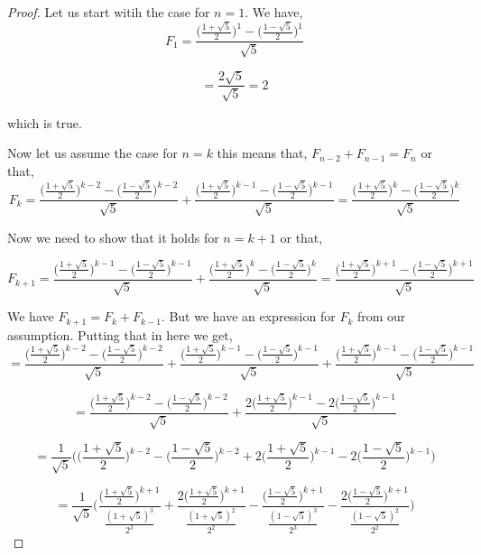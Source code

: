 \documentclass[a4paper]{report}
\begin{document}
\begin{proof}
    Let us start witih the case for $n = 1$. We have, 
    $$ F_1 = \frac{\big ( \frac{1 + \sqrt{5}}{2}\big)^{1} - \big ( \frac{1 - \sqrt{5}}{2}\big)^{1}}{\sqrt{5}} $$ 
    
    $$  = \frac{2\sqrt{5}}{\sqrt{5}} = 2  $$

    which is true.

    Now let us assume the case for $n = k$ this means that, $F_{n - 2} + F_{n - 1} = F_n$ or that,  
    $$ F_k = \frac{\big ( \frac{1 + \sqrt{5}}{2}\big)^{k - 2} - \big ( \frac{1 - \sqrt{5}}{2}\big)^{k - 2}}{\sqrt{5}}  + \frac{\big ( \frac{1 + \sqrt{5}}{2}\big)^{ k - 1} - \big ( \frac{1 - \sqrt{5}}{2}\big)^{k - 1}}{\sqrt{5}} = \frac{\big ( \frac{1 + \sqrt{5}}{2}\big)^{k} - \big ( \frac{1 - \sqrt{5}}{2}\big)^{k}}{\sqrt{5}}$$ 

    Now we need to show that it holds for $n = k + 1$ or that, 

    $$ F_{k + 1} = \frac{\big ( \frac{1 + \sqrt{5}}{2}\big)^{k - 1} - \big ( \frac{1 - \sqrt{5}}{2}\big)^{k - 1}}{\sqrt{5}}  + \frac{\big ( \frac{1 + \sqrt{5}}{2}\big)^{ k} - \big ( \frac{1 - \sqrt{5}}{2}\big)^{k}}{\sqrt{5}} = \frac{\big ( \frac{1 + \sqrt{5}}{2}\big)^{k + 1} - \big ( \frac{1 - \sqrt{5}}{2}\big)^{k + 1}}{\sqrt{5}}$$ 

    We have $F_{k + 1} = F_k + F_{k - 1}$. But we have an expression for  $F_k$ from our assumption. Putting that in here we get, 
    $$ = \frac{\big ( \frac{1 + \sqrt{5}}{2}\big)^{k - 2} - \big ( \frac{1 - \sqrt{5}}{2}\big)^{k - 2}}{\sqrt{5}}  + \frac{\big ( \frac{1 + \sqrt{5}}{2}\big)^{ k - 1} - \big ( \frac{1 - \sqrt{5}}{2}\big)^{k - 1}}{\sqrt{5}} + \frac{\big ( \frac{1 + \sqrt{5}}{2}\big)^{ k - 1} - \big ( \frac{1 - \sqrt{5}}{2}\big)^{k - 1}}{\sqrt{5}}  $$ 

    $$ = \frac{\big ( \frac{1 + \sqrt{5}}{2}\big)^{k - 2} - \big ( \frac{1 - \sqrt{5}}{2}\big)^{k - 2}}{\sqrt{5}}  + \frac{2\big ( \frac{1 + \sqrt{5}}{2}\big)^{ k - 1} - 2\big ( \frac{1 - \sqrt{5}}{2}\big)^{k - 1}}{\sqrt{5}} $$ 

    $$ = \frac{1}{\sqrt{5}}\bigg( \bigg ( \frac{1 + \sqrt{5}}{2}\bigg)^{k - 2} - \bigg ( \frac{1 - \sqrt{5}}{2}\bigg)^{k - 2}  + 2\bigg ( \frac{1 + \sqrt{5}}{2}\bigg)^{ k - 1} - 2\bigg ( \frac{1 - \sqrt{5}}{2}\bigg)^{k - 1}\bigg) $$ 

    $$ = \frac{1}{\sqrt{5}}\bigg( \frac{ \bigg ( \frac{1 + \sqrt{5}}{2}\bigg)^{k + 1}}{\frac{(1 + \sqrt{5})^{3}}{2^{3}}} +  \frac{ 2\bigg ( \frac{1 + \sqrt{5}}{2}\bigg)^{k + 1}}{\frac{(1 + \sqrt{5})^{2}}{2^{2}}} - \frac{ \bigg ( \frac{1 - \sqrt{5}}{2}\bigg)^{k + 1}}{\frac{(1 - \sqrt{5})^{3}}{2^{3}}} -  \frac{ 2\bigg ( \frac{1 - \sqrt{5}}{2}\bigg)^{k + 1}}{\frac{(1 - \sqrt{5})^{2}}{2^{2}}}   \bigg)   $$


\end{proof}
\end{document}
